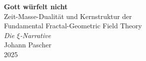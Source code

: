 \documentclass[11pt,openright,twoside]{book}
\begin{document}
\pagestyle{fancy}
\makeatletter
\let\ps@plain\ps@fancy
\let\ps@empty\ps@fancy
\makeatother

\begin{titlepage}
	\centering
	\vspace*{2cm}
	
	{\Huge\bfseries Gott würfelt nicht}\\[0.8cm]
	{\LARGE Zeit-Masse-Dualität und Kernstruktur der}\\[0.3cm]
	{\LARGE Fundamental Fractal-Geometric Field Theory}\\[1.5cm]
	
	{\Large\itshape Die $\xi$-Narrative}\\[2cm]
	
	{\large Johann Pascher}\\[1cm]
	
	{\large 2025}
	
	\vfill
\end{titlepage}

\frontmatter
\pagestyle{fancy}
\tableofcontents

\mainmatter
\pagestyle{fancy}




\end{document}
